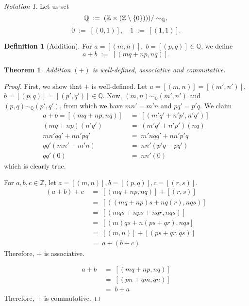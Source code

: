 \documentclass[10pt]{article}
\newtheorem{theorem}{Theorem}[section]
\theoremstyle{definition}
\newtheorem*{definition}{Definition}
\theoremstyle{remark}
\newtheorem*{notation}{Notation}
\newcommand{\Z}{\mathbb{Z}}
\newcommand{\Q}{\mathbb{Q}}
\newcommand{\Zm}{\Z\times(\Z\setminus\{0\})}
\newcommand{\simQ}{\sim_{\Q}}
\begin{document}
        \begin{notation}
        Let us set
        \[
                \Q \;:=\; (\Zm))/\simQ,\\
        \]
        \[
                \bar{0} \;:=\; [(0, 1)], \quad
                \bar{1} \;:=\; [(1, 1)].
        \]
        \end{notation}

        \begin{definition}[Addition]
        For $a = [(m, n)],\; b = [(p, q)] \in \Q$, we define
        \[
                a + b \;:=\; [(mq + np, nq)].
        \]
        \end{definition}
        
        \begin{theorem}
                Addition $(+)$ is well-defined, associative and commutative.
        \end{theorem}
        \begin{proof}
                First, we show that $+$ is well-defined.
                Let $a = [(m, n)] = [(m', n')]$, $b = [(p, q)] = [(p', q')] \in \Q$.
                Now, $(m, n) \simQ (m' , n')$ and $(p, q) \simQ (p', q')$, from which we have 
                $mn' = m'n$ and $pq' = p'q$.
                We claim 
                \begin{align*}
                a + b = [(mq + np, nq)] \;&=\; [(m'q' + n'p', n'q')] \\
                (mq + np)(n'q') \;&=\; (m'q' + n'p')(nq) \\
                mn'qq' + nn'pq' \;&=\; m'nqq' + nn'p'q \\
                qq'(mn' - m'n) \;&=\; nn'(p'q - pq') \\
                qq'(0) \;&=\; nn'(0)
                \end{align*}
                which is clearly true.

                For $a,b,c \in \Z$, let $a = [(m, n)], b = [(p, q)], c = [(r, s)]$.
                \begin{align*}
                        (a + b) + c \;&=\; [(mq + np, nq)] + [(r, s)] \\
                                \;&=\; [((mq + np)s + nq(r), nqs)] \\
                                \;&=\; [(mqs + nps + nqr, nqs)] \\
                                \;&=\; [(m)qs + n(ps + qr), nqs] \\
                                \;&=\; [(m, n)] + [(ps + qr, qs)] \\
                                \;&=\; a + (b + c)
                \end{align*}
                Therefore, $+$ is associative.

                \begin{align*}
                        a + b \;&=\; [(mq + np, nq)] \\
                                \;&=\; [(pn + qm, qn)] \\
                                \;&=\; b + a
                \end{align*}
                Therefore, $+$ is commutative.
        \end{proof}
\end{document}
